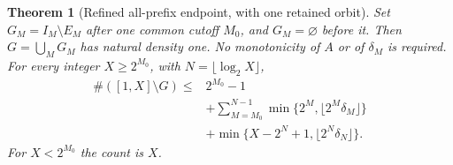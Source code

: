 \documentclass[11pt]{article}
\newtheorem{theorem}[proposition]{Theorem}
\theoremstyle{remark}\newtheorem{remark}[proposition]{Remark}
\begin{document}
\begin{theorem}[Refined all-prefix endpoint, with one retained orbit]
Set \(G_M=I_M\setminus E_M\) after one common cutoff \(M_0\), and
\(G_M=\varnothing\) before it. Then \(G=\bigcup_MG_M\) has natural
density one. No monotonicity of \(A\) or of \(\delta_M\) is required.
For every integer \(X\ge2^{M_0}\), with \(N=\lfloor\log_2X\rfloor\),
\begin{equation}\label{eq:shaik-refined-moving-global-count}
 \begin{split}
 \#([1,X]\setminus G)\le{}&2^{M_0}-1\\
 &+\sum_{M=M_0}^{N-1}
       \min\{2^M,\lfloor2^M\delta_M\rfloor\}\\
 &+\min\{X-2^N+1,\lfloor2^N\delta_N\rfloor\}.
 \end{split}
\end{equation}
For \(X<2^{M_0}\) the count is \(X\).
\end{theorem}
\end{document}
